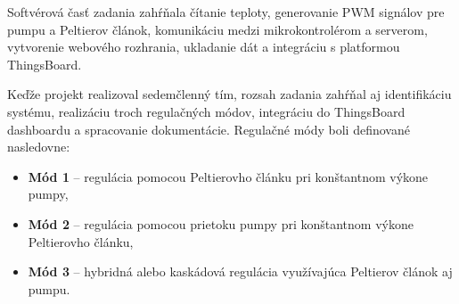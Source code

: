 Softvérová časť zadania zahŕňala čítanie teploty, generovanie PWM signálov pre pumpu a 
Peltierov článok, komunikáciu medzi mikrokontrolérom a serverom, vytvorenie webového rozhrania, 
ukladanie dát a integráciu s platformou ThingsBoard.

Keďže projekt realizoval sedemčlenný tím, rozsah zadania zahŕňal aj identifikáciu systému, 
realizáciu troch regulačných módov, integráciu do ThingsBoard dashboardu a spracovanie 
dokumentácie. Regulačné módy boli definované nasledovne:

\begin{itemize}
    \item \textbf{Mód 1} -- regulácia pomocou Peltierovho článku pri konštantnom výkone pumpy,
    \item \textbf{Mód 2} -- regulácia pomocou prietoku pumpy pri konštantnom výkone Peltierovho článku,
    \item \textbf{Mód 3} -- hybridná alebo kaskádová regulácia využívajúca Peltierov článok aj pumpu.
\end{itemize}

